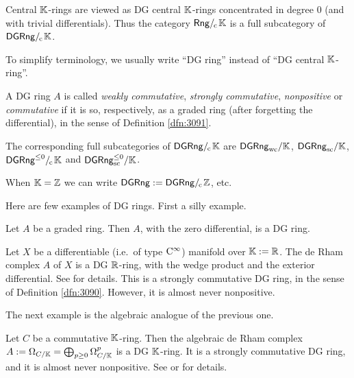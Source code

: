 Central $\mathbb{K}$-rings are viewed as DG central $\mathbb{K}$-rings concentrated in 
degree $0$ (and with trivial differentials). Thus the category $\mathrm{\mathsf{Rng}} 
/_{\mspace{-2mu} \mathrm{c}} \mspace{2mu} \mathbb{K}$ is a full subcategory of $\mathrm{\mathsf{DGRng}} /_{\mspace{-2mu} \mathrm{c}} \mspace{2mu} \mathbb{K}$. 

\begin{conv} \label{conv:4626}
To simplify terminology, we usually write ``DG ring'' instead of 
``DG central $\mathbb{K}$-ring''. 
\end{conv}

\begin{dfn} \label{dfn:3090}
A DG ring $A$ is called {\em weakly commutative}, {\em strongly 
commutative}, {\em nonpositive} or {\em commutative} if it is so, respectively, 
as a graded ring (after forgetting the differential), in the sense of 
Definition \ref{dfn:3091}. 

The corresponding full subcategories of $\mathrm{\mathsf{DGRng}} /_{\mspace{-2mu} \mathrm{c}} \mspace{2mu} \mathbb{K}$ are 
$\mathrm{\mathsf{DGRng}}_{\mathrm{wc}} / \mathbb{K}$,  $\mathrm{\mathsf{DGRng}}_{\mathrm{sc}} / \mathbb{K}$,
$\mathrm{\mathsf{DGRng}}^{\leq 0} /_{\mspace{-2mu} \mathrm{c}} \mspace{2mu} \mathbb{K}$ and 
$\mathrm{\mathsf{DGRng}}^{\leq 0}_{\mathrm{sc}} / \mathbb{K}$.
\end{dfn}
 
When $\mathbb{K} = \mathbb{Z}$ we can write $\mathrm{\mathsf{DGRng}} := \mathrm{\mathsf{DGRng}} /_{\mspace{-2mu} \mathrm{c}} \mspace{2mu} \mathbb{Z}$, etc.

Here are few examples of DG rings. First a silly example.

\begin{exa} \label{exa:1095}
Let $A$ be a graded ring. Then $A$, with the zero differential, 
is a DG ring.
\end{exa}

\begin{exa} \label{exa:1096}
Let $X$ be a differentiable (i.e.\ of type $\mathrm{C}^{\infty}$) manifold over 
$\mathbb{K} := \mathbb{R}$. The de Rham complex $A$ of $X$ is a DG $\mathbb{R}$-ring, with the wedge 
product and the exterior differential. See \cite[Section 2.9.7]{KaSc1} for 
details. This is a strongly commutative DG ring, in the sense of Definition 
\ref{dfn:3090}. However, it is almost never nonpositive. 
\end{exa}

The next example  is the algebraic analogue of the previous one.
 
\begin{exa} \label{exa:1097}
Let $C$ be a commutative $\mathbb{K}$-ring. Then the algebraic de Rham complex
$A := \Omega_{C / \mathbb{K}} = \bigoplus_{p \geq 0} \Omega^p_{C / \mathbb{K}}$ is a
DG $\mathbb{K}$-ring. It is a strongly commutative DG ring, and it is 
almost never nonpositive. 
See \cite[Exercise 16.15]{Eis} or \cite[Section 25]{Mats} for details. 
\end{exa}

